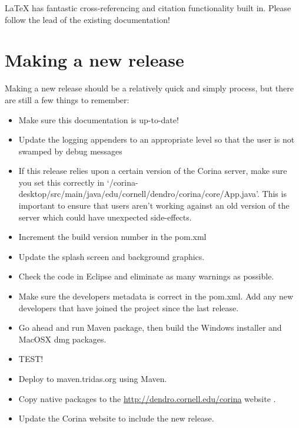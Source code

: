 {\LaTeX} has fantastic cross-referencing and citation functionality built in.  Please follow the lead of the existing documentation!


\section{Making a new release}
Making a new release should be a relatively quick and simply process, but there are still a few things to remember:

\begin{itemize}
 \item Make sure this documentation is up-to-date!  
 \item Update the logging appenders to an appropriate level so that the user is not swamped by debug messages
 \item If this release relies upon a certain version of the Corina server, make sure you set this correctly in `/corina-desktop/src/main/java/edu/cornell/dendro/corina/core/App.java'.  This is important to ensure that users aren't working against an old version of the server which could have unexpected side-effects.
 \item Increment the build version number in the pom.xml
 \item Update the splash screen and background graphics.
 \item Check the code in Eclipse and eliminate as many warnings as possible.
 \item Make sure the developers metadata is correct in the pom.xml.  Add any new developers that have joined the project since the last release.
 \item Go ahead and run Maven package, then build the Windows installer and MacOSX dmg packages.
 \item TEST!
 \item Deploy to maven.tridas.org using Maven.
 \item Copy native packages to the \url{http://dendro.cornell.edu/corina} website .
 \item Update the Corina website to include the new release.
\end{itemize}


